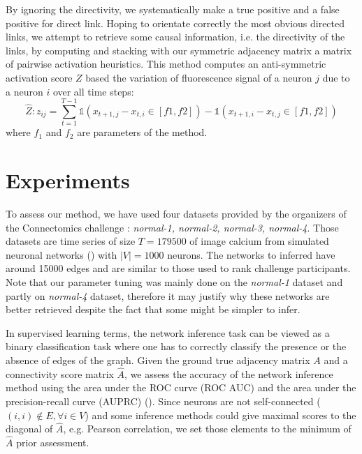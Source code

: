 \documentclass[wcp]{jmlr}
\begin{document}
By ignoring the directivity, we systematically make a true positive and a
false positive for direct link.  Hoping to orientate
correctly the most obvious directed links, we attempt to retrieve some causal
information, i.e. the directivity of the links, by computing and stacking with
our symmetric adjacency matrix a matrix of pairwise activation heuristics.
This method computes an anti-symmetric activation score $Z$ based the
variation of fluorescence signal of a neuron $j$ due to a neuron $i$ over all
time steps:
\[
\hat{Z}: z_{ij} = \sum_{t=1}^{T - 1}
    \mathbb{1}(x_{t+1,j} - x_{t, i} \in \left[f1, f2 \right]) -
    \mathbb{1}(x_{t+1,i} - x_{t, j} \in \left[f1, f2 \right])
\]
where $f_1$ and $f_2$ are parameters of the method.

\section{Experiments}

To assess our method, we have used four datasets provided by the organizers
of the Connectomics challenge : \textit{normal-1, normal-2, normal-3, normal-4}.
Those datasets are time series of size $T=179500$ of image calcium from simulated
neuronal networks (\cite{stetter2012model}) with $|V|=1000$ neurons. The networks
to inferred have around 15000 edges and are similar to those
used to rank challenge participants. Note that our parameter tuning was mainly
done on the \textit{normal-1} dataset and partly on \textit{normal-4} dataset,
therefore it may justify why these networks are better retrieved despite the
fact that some might be simpler to infer.

In supervised learning terms, the network inference task can be viewed as a
binary classification task where one has to correctly classify the presence
or the absence of edges of the graph. Given the ground true adjacency matrix
$A$ and a connectivity score matrix $\hat{A}$, we assess the accuracy of the
network inference method using the area under the ROC curve (ROC AUC)
and the area under the precision-recall curve (AUPRC)
(\cite{schrynemackers2013protocols}). Since neurons are not self-connected
($(i, i) \not \in E, \forall i \in V$) and some inference methods could
give maximal scores to the diagonal of $\hat{A}$, e.g. Pearson
correlation, we set those elements to the minimum of $\hat{A}$ prior
assessment.


\end{document}
